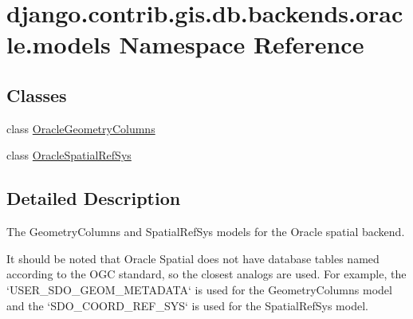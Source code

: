 \hypertarget{namespacedjango_1_1contrib_1_1gis_1_1db_1_1backends_1_1oracle_1_1models}{}\section{django.\+contrib.\+gis.\+db.\+backends.\+oracle.\+models Namespace Reference}
\label{namespacedjango_1_1contrib_1_1gis_1_1db_1_1backends_1_1oracle_1_1models}
\subsection*{Classes}
\begin{DoxyCompactItemize}
\item 
class \mbox{\hyperlink{classdjango_1_1contrib_1_1gis_1_1db_1_1backends_1_1oracle_1_1models_1_1_oracle_geometry_columns}{Oracle\+Geometry\+Columns}}
\item 
class \mbox{\hyperlink{classdjango_1_1contrib_1_1gis_1_1db_1_1backends_1_1oracle_1_1models_1_1_oracle_spatial_ref_sys}{Oracle\+Spatial\+Ref\+Sys}}
\end{DoxyCompactItemize}


\subsection{Detailed Description}
\begin{DoxyVerb} The GeometryColumns and SpatialRefSys models for the Oracle spatial
 backend.

 It should be noted that Oracle Spatial does not have database tables
 named according to the OGC standard, so the closest analogs are used.
 For example, the `USER_SDO_GEOM_METADATA` is used for the GeometryColumns
 model and the `SDO_COORD_REF_SYS` is used for the SpatialRefSys model.
\end{DoxyVerb}
 